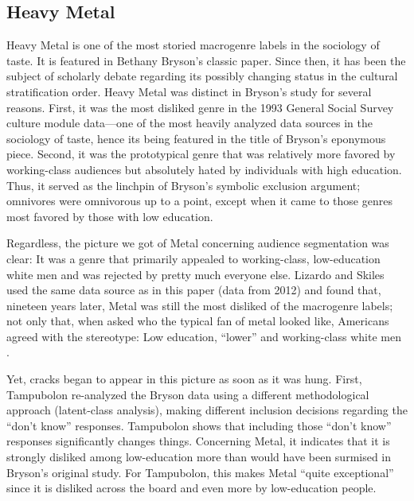 \documentclass[a4paper,12pt]{extarticle}
\begin{document}
\subsection{Heavy Metal}
Heavy Metal is one of the most storied macrogenre labels in the sociology of taste. It is featured in Bethany Bryson's \citeyearpar{bryson96} classic paper. Since then, it has been the subject of scholarly debate regarding its possibly changing status in the cultural stratification order. Heavy Metal was distinct in Bryson's study for several reasons. First, it was the most disliked genre in the 1993 General Social Survey culture module data---one of the most heavily analyzed data sources in the sociology of taste, hence its being featured in the title of Bryson's eponymous piece. Second, it was the prototypical genre that was relatively more favored by working-class audiences but absolutely hated by individuals with high education. Thus, it served as the linchpin of Bryson's symbolic exclusion argument; omnivores were omnivorous up to a point, except when it came to those genres most favored by those with low education. 

Regardless, the picture we got of Metal concerning audience segmentation was clear: It was a genre that primarily appealed to working-class, low-education white men and was rejected by pretty much everyone else. Lizardo and Skiles \citeyearpar[][6, table 2]{lizardo_skiles16} used the same data source as in this paper (data from 2012) and found that, nineteen years later, Metal was still the most disliked of the macrogenre labels; not only that, when asked who the typical fan of metal looked like, Americans agreed with the stereotype: Low education, ``lower'' and working-class white men \citep[][7, table 3]{lizardo_skiles16}. 

Yet, cracks began to appear in this picture as soon as it was hung. First, Tampubolon \citeyearpar{tampubolon2008revisiting} re-analyzed the Bryson data using a different methodological approach (latent-class analysis), making different inclusion decisions regarding the ``don't know'' responses. Tampubolon shows that including those ``don't know'' responses significantly changes things. Concerning Metal, it indicates that it is strongly disliked among low-education more than would have been surmised in Bryson's original study. For Tampubolon, this makes Metal ``quite exceptional'' since it is disliked across the board and even more by low-education people. 
\end{document}
